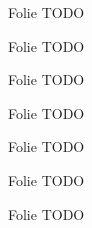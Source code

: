 \begin{frame}{Folie}
    TODO
\end{frame}

\begin{frame}{Folie}
    TODO
\end{frame}

\begin{frame}{Folie}
    TODO
\end{frame}

\begin{frame}{Folie}
    TODO
\end{frame}

\begin{frame}{Folie}
    TODO
\end{frame}

\begin{frame}{Folie}
    TODO
\end{frame}

\begin{frame}{Folie}
    TODO
\end{frame}


